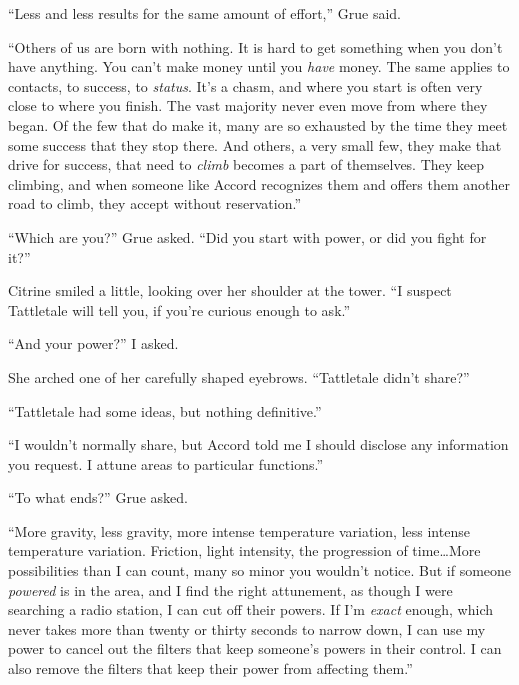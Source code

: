 ``Less and less results for the same amount of effort,'' Grue said.



``Others of us are born with nothing.  It is hard to get something when you don't have anything.  You can't make money until you \emph{have} money.  The same applies to contacts, to success, to \emph{status}.  It's a chasm, and where you start is often very close to where you finish.  The vast majority never even move from where they began.  Of the few that do make it, many are so exhausted by the time they meet some success that they stop there.  And others, a very small few, they make that drive for success, that need to \emph{climb} becomes a part of themselves.  They keep climbing, and when someone like Accord recognizes them and offers them another road to climb, they accept without reservation.''



``Which are you?'' Grue asked.  ``Did you start with power, or did you fight for it?''



Citrine smiled a little, looking over her shoulder at the tower.  ``I suspect Tattletale will tell you, if you're curious enough to ask.''



``And your power?'' I asked.



She arched one of her carefully shaped eyebrows.  ``Tattletale didn't share?''



``Tattletale had some ideas, but nothing definitive.''



``I wouldn't normally share, but Accord told me I should disclose any information you request.  I attune areas to particular functions.''



``To what ends?'' Grue asked.



``More gravity, less gravity, more intense temperature variation, less intense temperature variation.  Friction, light intensity, the progression of time\ldots More possibilities than I can count, many so minor you wouldn't notice.  But if someone \emph{powered} is in the area, and I find the right attunement, as though I were searching a radio station, I can cut off their powers.  If I'm \emph{exact }enough, which never takes more than twenty or thirty seconds to narrow down, I can use my power to cancel out the filters that keep someone's powers in their control.  I can also remove the filters that keep their power from affecting them.''



